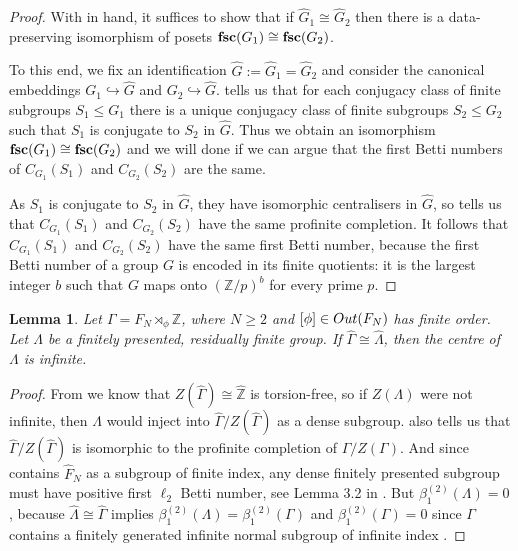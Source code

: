\documentclass[11pt, a4 paper]{amsart}
\numberwithin{equation}{section}
\newtheorem{lemma}[theorem]{Lemma}
\theoremstyle{remark}
\theoremstyle{definition}
\def\Z{\mathbb Z}
\def\G{\Gamma}
\def\wh{\widehat}
\def\tsc{{\rm{\bf{fsc}}}}
\def\G{\Gamma}
\begin{document}
\begin{proof}
	With  in hand, 
	it suffices to show that if $\wh{G}_1\cong\wh{G}_2$ 
	then there is a data-preserving isomorphism of posets 
	$\tsc(G_1)\cong\tsc(G_2)$. 
	
	To this end, we fix an identification $\wh{G}:=\wh{G}_1=\wh{G}_2$ 
	and consider the canonical embeddings 
	$G_1\hookrightarrow\wh{G}$ and $G_2\hookrightarrow\wh{G}$. 
	 tells us that 
	for each conjugacy class of finite subgroups $S_1 \leq G_1$ 
	there is a unique conjugacy class 
	of finite subgroups $S_2 \leq G_2$ 
	such that $S_1$ is conjugate to $S_2$ in $\wh{G}$. 
	Thus we obtain an isomorphism $\tsc(G_1)\cong \tsc(G_2)$ 
	and we will done if we can argue 
	that the first Betti numbers 
	of $C_{G_1}(S_1)$ and $C_{G_2}(S_2)$ are the same. 
	
	As $S_1$ is conjugate to $S_2$ in $\wh{G}$, 
	they have isomorphic centralisers in $\wh{G}$, 
	so  tells us that 
	$C_{G_1}(S_1)$ and $C_{G_2}(S_2)$ have 
	the same profinite completion. 
	It follows that $C_{G_1}(S_1)$ and $C_{G_2}(S_2)$ 
	have the same first Betti number, because 
	the first Betti number of a group $G$ is encoded in its finite quotients: it is the largest
	integer $b$ such that $G$ maps onto $(\Z/p)^b$ for every prime $p$. 
\end{proof}

\begin{lemma}
\label{l:l2centre}
	Let $\G=F_{N}\rtimes_{\phi}\Z$, 
	where $N\ge 2$ and $[\phi]\in{\rm{Out}}(F_N)$ has finite order. 
	Let $\Lambda$ be a finitely presented, residually finite group. 
	If $\wh{\G}\cong \wh{\Lambda}$, 
	then the centre of $\Lambda$ is infinite. 
\end{lemma}

\begin{proof} 
	From  we know that 
	$Z(\wh{\G}) \cong\wh{\Z}$ is torsion-free, 
	so if $Z(\Lambda)$ were not infinite, 
	then $\Lambda$ would inject into $\wh{\G}/Z(\wh{\G})$ 
	as a dense subgroup. 
	 also tells us that  
	$\wh{\G}/Z(\wh{\G})$ is isomorphic 
	to the profinite completion of $\G/Z(\G)$. 
	And since contains $\wh{F}_N$ as a subgroup of finite index, 
	any dense finitely presented subgroup 
	must have positive first $\ell_2$ Betti number, 
	see Lemma 3.2 in \cite{bridson2021profinite}. 
	But $\beta_1^{(2)}(\Lambda)=0$, 
	because $\wh{\Lambda}\cong\wh{\G}$ implies 
	$\beta_1^{(2)}(\Lambda)=\beta_1^{(2)}(\G)$
	and $\beta_1^{(2)}(\G)=0$ 
	since $\G$ contains a finitely generated 
	infinite normal subgroup of infinite index \cite{gaboriau}.  
\end{proof}
\end{document}
